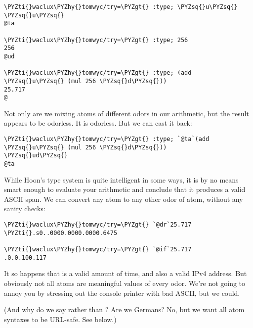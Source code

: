 \begin{framed_shaded}
\begin{Verbatim}[fontsize=\relsize{-2.5},fontseries=b,commandchars=\\\{\}]
\PYZti{}waclux\PYZhy{}tomwyc/try=\PYZgt{} :type; \PYZsq{}u\PYZsq{}
\PYZsq{}u\PYZsq{}
@ta

\PYZti{}waclux\PYZhy{}tomwyc/try=\PYZgt{} :type; 256 
256
@ud

\PYZti{}waclux\PYZhy{}tomwyc/try=\PYZgt{} :type; (add \PYZsq{}u\PYZsq{} (mul 256 \PYZsq{}d\PYZsq{}))
25.717
@
\end{Verbatim}
\end{framed_shaded}
Not only are we mixing atoms of different odors in our
arithmetic, but the result appears to be odorless.  It is
odorless.  But we can cast it back:

\begin{framed_shaded}
\begin{Verbatim}[fontsize=\relsize{-2.5},fontseries=b,commandchars=\\\{\}]
\PYZti{}waclux\PYZhy{}tomwyc/try=\PYZgt{} :type; `@ta`(add \PYZsq{}u\PYZsq{} (mul 256 \PYZsq{}d\PYZsq{}))
\PYZsq{}ud\PYZsq{}
@ta
\end{Verbatim}
\end{framed_shaded}
While Hoon's type system is quite intelligent in some ways, it is
by no means smart enough to evaluate your arithmetic and conclude
that it produces a valid ASCII span.  We can convert any atom to
any other odor of atom, without any sanity checks:

\begin{framed_shaded}
\begin{Verbatim}[fontsize=\relsize{-2.5},fontseries=b,commandchars=\\\{\}]
\PYZti{}waclux\PYZhy{}tomwyc/try=\PYZgt{} `@dr`25.717
\PYZti{}.s0..0000.0000.0000.6475

\PYZti{}waclux\PYZhy{}tomwyc/try=\PYZgt{} `@if`25.717
.0.0.100.117
\end{Verbatim}
\end{framed_shaded}
It so happens that  is a valid amount of time, and also a
valid IPv4 address.  But obviously not all atoms are meaningful
values of every odor.  We're not going to annoy you by stressing
out the console printer with bad ASCII, but we could.

(And why do we say  rather than ?  Are we
Germans?  No, but we want all atom syntaxes to be URL-safe.
See below.)

